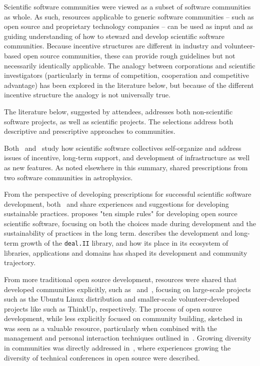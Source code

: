 \documentclass[11pt, oneside]{amsart}
\begin{document}
Scientific software communities were viewed as a subset of software
communities as whole.  As such, resources applicable to generic
software communities -- such as open source and proprietary technology
companies -- can be used as input and as guiding understanding of how
to steward and develop scientific software communities.  Because
incentive structures are different in industry and volunteer-based
open source communities, these can provide rough guidelines but not
necessarily identically applicable.  The analogy between corporations
and scientific investigators (particularly in terms of competition,
cooperation and competitive advantage) has been explored in the
literature below, but because of the different incentive structure the
analogy is not universally true.

The literature below, suggested by attendees, addresses both
non-scientific software projects, as well as scientific projects.  The
selections address both descriptive and prescriptive approaches to
communities.

Both~\cite{howison_scientific_2011} and~\cite{howison_incentives_2013}
study how scientific software collectives self-organize and address
issues of incentive, long-term support, and development of
infrastructure as well as new features.  As noted elsewhere in this
summary, \cite{Turk:2013:SCH:2484762.2484782} shared prescriptions
from two software communities in astrophysics.

From the perspective of developing prescriptions for successful
scientific software development, both~\cite{citeulike:11831265} and
\cite{1749-4699-6-1-015010} share experiences and suggestions for
developing sustainable practices.  \cite{citeulike:11831265} proposes
"ten simple rules" for developing open source scientific software,
focusing on both the choices made during development and the
sustainability of practices in the long term.
\cite{1749-4699-6-1-015010} describes the development and long-term
growth of the \texttt{deal.II} library, and how its place in its
ecosystem of libraries, applications and domains has shaped its
development and community trajectory.

From more traditional open source development, resources were shared
that developed communities explicitly, such
as~\cite{citeulike:7888211} and~\cite{Trapani:2011}, focusing on
large-scale projects such as the Ubuntu Linux distribution and
smaller-scale volunteer-developed projects like such as ThinkUp,
respectively. The process of open source development, while less
explicitly focused on community building, sketched
in~\cite{citeulike:478633} was seen as a valuable resource,
particularly when combined with the management and personal
interaction techniques outlined in~\cite{opac-b1134063}.  Growing
diversity in communities was directly addressed
in~\cite{Allsopp:2012}, where experiences growing the diversity of
technical conferences in open source were described.
\end{document}
